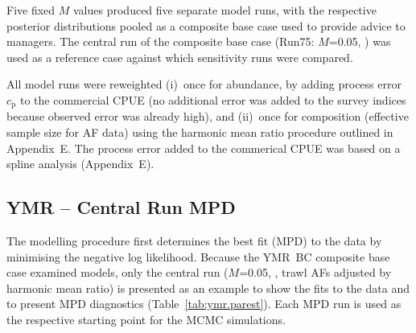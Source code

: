 \documentclass[11pt]{book}
\newcommand{\AppEqn}{Appendix~E}
\begin{document}
Five fixed $M$ values produced five separate model runs, with the respective posterior distributions pooled as a composite base case used to provide advice to managers.
The central run of the composite base case (Run75: $M$=0.05, ) was used as a reference case against which  sensitivity runs were compared.

All model runs were reweighted (i)~once for abundance, by adding process error $c_\mathrm{p}$ to the commercial CPUE (no additional error was added to the survey indices because observed error was already high), and (ii)~once for composition (effective sample size for AF data) using the harmonic mean ratio procedure outlined in \AppEqn.
The process error added to the commerical CPUE was based on a spline analysis (\AppEqn).

\subsection{YMR -- Central Run MPD}


The modelling procedure first determines the best fit (MPD) to the data by minimising the negative log likelihood.
Because the YMR~BC composite base case examined  models, only the central run ($M$=0.05, , trawl AFs adjusted by harmonic mean ratio) is presented as an example to show the fits to the data and to present MPD diagnostics (Table~\ref{tab:ymr.parest}).
Each MPD run is used as the respective starting point for the MCMC simulations.
\end{document}
